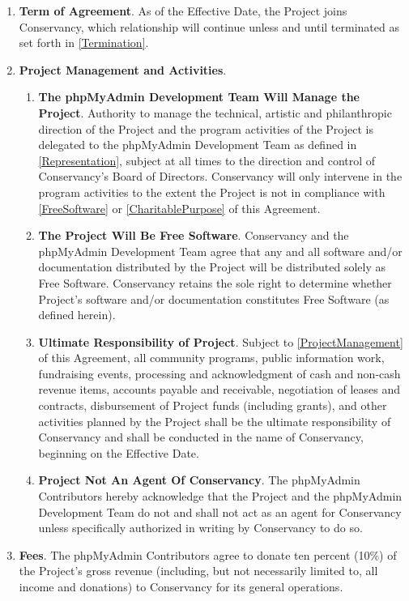 \documentclass[letterpaper,12pt]{article}
\newcommand{\signatories}{phpMyAdmin Contributors\xspace}
\newcommand{\leadershipbody}{phpMyAdmin Development Team\xspace}
\begin{document}
\begin{enumerate}[label=\arabic*.,ref=\S~\arabic*]
\item \textbf{Term of Agreement}. As of the Effective Date, the Project
joins Conservancy, which relationship will continue unless and until
terminated as set forth in \ref{Termination}. 
\item \textbf{Project Management and Activities}.


\begin{enumerate}[label=\alph*.,ref=\theenumi(\alph*)]
\item \textbf{The \leadershipbody Will Manage the Project}. \label{ProjectManagement}
Authority to manage the technical, artistic and philanthropic direction
of the Project and the program activities of the Project is delegated
to the \leadershipbody as defined in \ref{Representation},
subject at all times to the direction and control of Conservancy's
Board of Directors. Conservancy will only intervene in the program
activities to the extent the Project is not in compliance with \ref{FreeSoftware}
or \ref{CharitablePurpose} of this Agreement. 
\item \textbf{The Project Will Be Free Software}. \label{FreeSoftware}
Conservancy and the \leadershipbody agree that any and all software
and/or documentation distributed by the Project will be distributed solely as Free Software.
Conservancy retains the sole right to determine whether Project's
software and/or documentation constitutes Free Software (as defined herein).
\item \textbf{Ultimate Responsibility of Project}. Subject to \ref{ProjectManagement}
of this Agreement, all community programs, public information work,
fundraising events, processing and acknowledgment of cash and non-cash
revenue items, accounts payable and receivable, negotiation of leases
and contracts, disbursement of Project funds (including grants), and
other activities planned by the Project shall be the ultimate responsibility
of Conservancy and shall be conducted in the name of Conservancy,
beginning on the Effective Date. 
\item \textbf{Project Not An Agent Of Conservancy}. The \signatories
hereby acknowledge that the Project and the \leadershipbody
do not and shall not act as an agent for Conservancy unless specifically
authorized in writing by Conservancy to do so. 
\end{enumerate}
\item \textbf{Fees}. The \signatories agree to donate ten percent
(10\%) of the Project's gross revenue (including, but not necessarily limited
to, all income and donations) to Conservancy for its general operations.



\end{enumerate}
\end{document}

